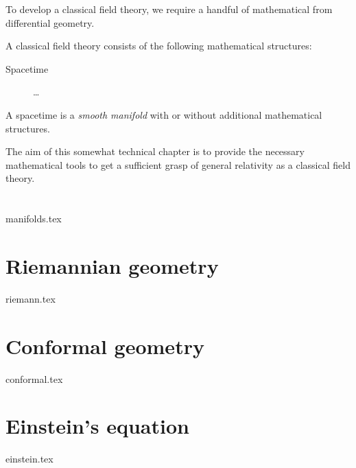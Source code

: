 








\phpar

To develop a classical field theory, we require a handful of mathematical  from differential geometry.

A classical field theory consists of the following mathematical structures:
\begin{description}
    \item[Spacetime] \dots
\end{description}

A spacetime is a \emph{smooth manifold} with or without additional mathematical structures.



The aim of this somewhat technical chapter is to provide the necessary mathematical tools to get a sufficient grasp of general relativity as a classical field theory.




\section{}
    {{manifolds.tex}}



\section{Riemannian geometry}\label{sec:diffgeo:riemann}
    {{riemann.tex}}


\section{Conformal geometry}\label{sec:diffgeo:conformal}
    {{conformal.tex}}





\section{Einstein's equation}\label{sec:diffgeo:einstein}
    {{einstein.tex}}
